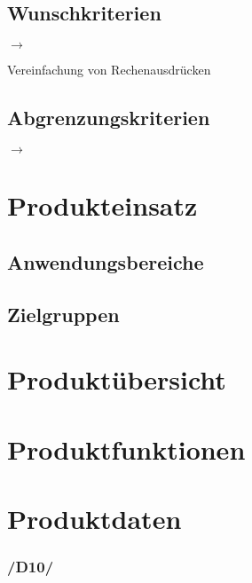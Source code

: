 \documentclass[10pt,a4paper]{article}
\begin{document}
	\subsection{Wunschkriterien}
	
	\begin{list}{$\rightarrow$}{}
		\item Vereinfachung von Rechenausdrücken
		\item 
	\end{list}
	
	\subsection{Abgrenzungskriterien}
	
	\begin{list}{$\rightarrow$}{}
		\item 
		\item 	
	\end{list}
	
	\section{Produkteinsatz}
	
	\subsection{Anwendungsbereiche}
		
	\subsection{Zielgruppen}
	
	\section{Produktübersicht}
	
	\section{Produktfunktionen}	
	
	\section{Produktdaten}
	
	\subsubsection*{/D10/}
	
\end{document}
